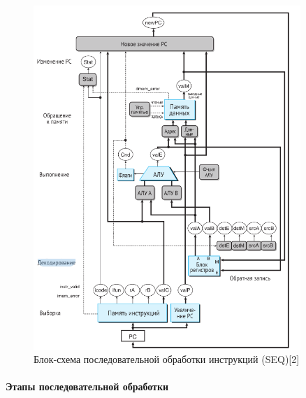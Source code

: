 \documentclass[12pt,a4paper]{article}
\begin{document}
\begin{figure}[ht!]
\centering
\includegraphics[width=0.9\textwidth]{seq.png}
\caption{Блок-схема последовательной обработки инструкций (SEQ)[2]}
\label{fig:seq}
\end{figure}

\paragraph{Этапы последовательной обработки}
\end{document}
